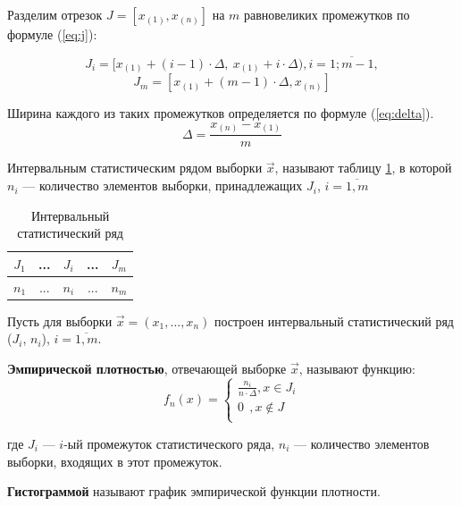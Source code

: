 Разделим отрезок $J = [x_{(1)}, x_{(n)}]$ на $m$ равновеликих промежутков по формуле (\ref{eq:j}):

\begin{equation*}
	J_i = [x_{(1)} + (i - 1) \cdot \Delta,\ x_{(1)} + i \cdot \Delta), i = \overline{1; m - 1},
\end{equation*}
\begin{equation}
	\label{eq:j}
	J_{m} = [x_{(1)} + (m - 1) \cdot \Delta, x_{(n)}]
\end{equation}

Ширина каждого из таких промежутков определяется по формуле (\ref{eq:delta}).
\begin{equation}
	\label{eq:delta}
	\Delta = \frac{x_{(n)} - x_{(1)}}{m}
\end{equation}

Интервальным статистическим рядом выборки $\vec{x}$, называют таблицу \ref{table:row1}, в которой $n_i$ --- количество элементов выборки, принадлежащих $J_i$, $i=\overline{1,m}$

\begin{table}[ht!]
	\captionsetup{singlelinecheck = false, justification=raggedright}
	\caption{Интервальный статистический ряд}
	\centering
	\label{table:row1}
	\begin{tabular}{|c|c|c|c|c|}
		\hline
		$J_1$ & ... & $J_i$ & ... & $J_m$ \\
		\hline
		$n_1$ & ... & $n_i$ & ... & $n_m$ \\
		\hline
	\end{tabular}
\end{table}

Пусть для выборки $\vec{x} = (x_1, \dots, x_n)$ построен интервальный статистический ряд ($J_i$, $n_i$), $i=\overline{1,m}$.

\textbf{Эмпирической плотностью}, отвечающей выборке $\vec x$, называют функцию:
\begin{equation}
	f_n(x) =
	\begin{cases}
		\frac{n_i}{n \cdot \Delta}, x \in J_i \\
		0\ \ , x \not\in J                    \\
	\end{cases}
\end{equation}

где $J_i$ --- $i$-ый промежуток статистического ряда,
$n_i$ --- количество элементов выборки, входящих в этот промежуток.

\textbf{Гистограммой} называют график эмпирической функции плотности.

